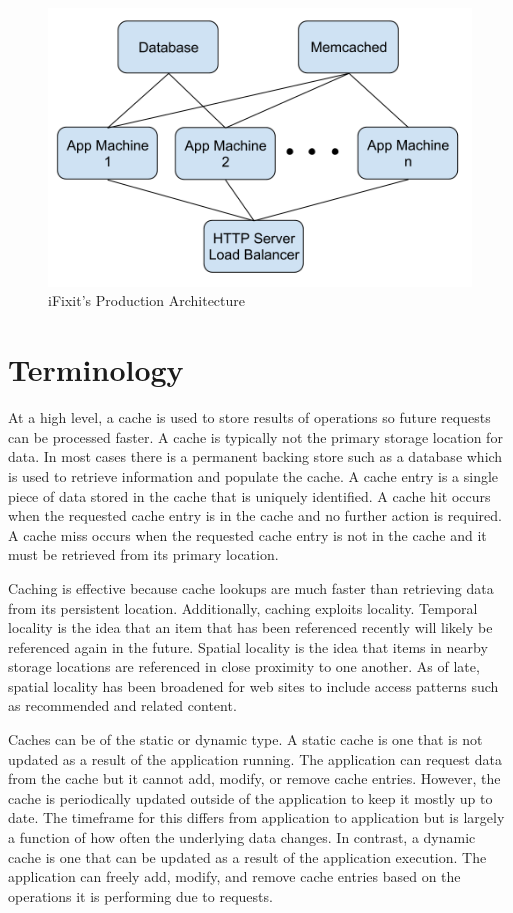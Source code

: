 \documentclass[12pt]{ucthesis}
\begin{document}
\begin{figure}[h]
\centering
\includegraphics[width=\textwidth]{assets/iFixitArchitecture.png}
\caption{iFixit's Production Architecture}
\label{fig:iFixitArchitecture}
\end{figure}

\section{Terminology}
At a high level, a cache is used to store results of operations so future requests can be processed faster.
A cache is typically not the primary storage location for data.
In most cases there is a permanent backing store such as a database which is used to retrieve information and populate the cache.
A cache entry is a single piece of data stored in the cache that is uniquely identified.
A cache hit occurs when the requested cache entry is in the cache and no further action is required.
A cache miss occurs when the requested cache entry is not in the cache and it must be retrieved from its primary location.

Caching is effective because cache lookups are much faster than retrieving data from its persistent location.
Additionally, caching exploits locality.
Temporal locality is the idea that an item that has been referenced recently will likely be referenced again in the future.
Spatial locality is the idea that items in nearby storage locations are referenced in close proximity to one another.
As of late, spatial locality has been broadened for web sites to include access patterns such as recommended and related content.

Caches can be of the static or dynamic type.
A static cache is one that is not updated as a result of the application running.
The application can request data from the cache but it cannot add, modify, or remove cache entries.
However, the cache is periodically updated outside of the application to keep it mostly up to date.
The timeframe for this differs from application to application but is largely a function of how often the underlying data changes.
In contrast, a dynamic cache is one that can be updated as a result of the application execution.
The application can freely add, modify, and remove cache entries based on the operations it is performing due to requests.
\end{document}
